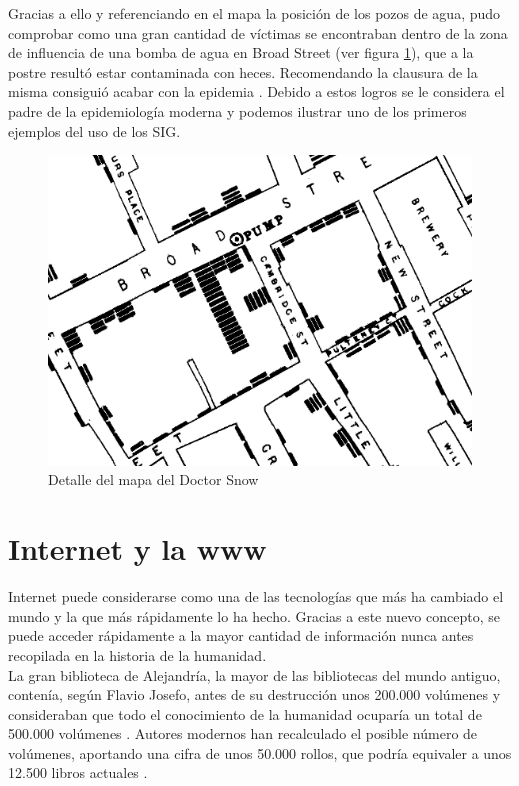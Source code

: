 Gracias a ello y referenciando en el mapa la posición de los pozos de agua, pudo comprobar como una gran cantidad de víctimas se encontraban dentro de la zona de influencia de una bomba de agua en Broad Street (ver figura \ref{fig:cholera_map_detail}), que a la postre resultó estar contaminada con heces. Recomendando la clausura de la misma consiguió acabar con la epidemia      \cite{Gunn07}. Debido a estos logros se le considera el padre de la epidemiología moderna y podemos ilustrar uno de los primeros ejemplos del uso de los \ac{SIG}.

\begin{figure}[hbtp]
\centering
\includegraphics[scale=0.5, fbox={\fboxrule} 4mm]{images/03-antecedentes/03-cholera_map_detail.png}
\caption{Detalle del mapa del Doctor Snow}
\label{fig:cholera_map_detail}
\end{figure}

\section{Internet y la \ac{www}}

Internet puede considerarse como una de las tecnologías que más ha cambiado el mundo y la que más rápidamente lo ha hecho. Gracias a este nuevo concepto, se puede acceder rápidamente a la mayor cantidad de información nunca antes recopilada en la historia de la humanidad.\\

La gran biblioteca de Alejandría, la mayor de las bibliotecas del mundo antiguo, contenía, según Flavio Josefo, antes de su destrucción unos 200.000 volúmenes y consideraban que todo el conocimiento de la humanidad ocuparía un total de 500.000 volúmenes  \cite{Jos94}. Autores modernos han recalculado el posible número de volúmenes, aportando una cifra de unos 50.000 rollos, que podría equivaler a unos 12.500 libros actuales \cite{Esco01}.\\

